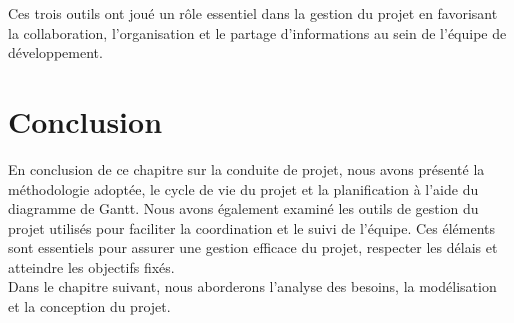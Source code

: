 Ces trois outils ont joué un rôle essentiel dans la gestion du projet en favorisant la collaboration, l'organisation et le partage d'informations au sein de l'équipe de développement.

\newpage

\section{Conclusion}
En conclusion de ce chapitre sur la conduite de projet, nous avons présenté la méthodologie adoptée, le cycle de vie du projet et la planification à l'aide du diagramme de Gantt. Nous avons également examiné les outils de gestion du projet utilisés pour faciliter la coordination et le suivi de l'équipe. Ces éléments sont essentiels pour assurer une gestion efficace du projet, respecter les délais et atteindre les objectifs fixés.\\
Dans le chapitre suivant, nous aborderons l'analyse des besoins, la modélisation et la conception du projet.